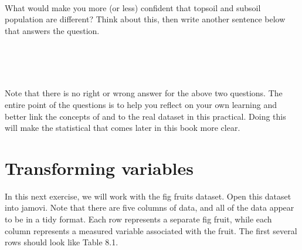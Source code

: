 \documentclass[
  openany]{krantz}
\begin{document}
\begin{verbatim}




\end{verbatim}

What would make you more (or less) confident that topsoil and subsoil population  are different?
Think about this, then write another sentence below that answers the question.

\begin{verbatim}




\end{verbatim}

Note that there is no right or wrong answer for the above two questions.
The entire point of the questions is to help you reflect on your own learning and better link the concepts of  and  to the real dataset in this practical.
Doing this will make the statistical  that comes later in this book more clear.

\hypertarget{transforming_variables_02}{%
\section{Transforming variables}\label{transforming_variables_02}}

In this next exercise, we will work with the fig fruits dataset.
Open this dataset into jamovi.
Note that there are five columns of data, and all of the data appear to be in a tidy format.
Each row represents a separate fig fruit, while each column represents a measured variable associated with the fruit.
The first several rows should look like Table 8.1.
\end{document}
